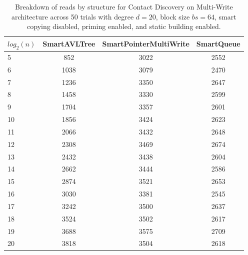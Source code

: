 \begin{table}[]
\centering
\begin{tabular}{|l|c|c|c|}
$log_2(n)$ & SmartAVLTree & SmartPointerMultiWrite & SmartQueue \\ \hline
5 & 852 & 3022 & 2552 \\ \hline
6 & 1038 & 3079 & 2470 \\ \hline
7 & 1236 & 3350 & 2647 \\ \hline
8 & 1458 & 3330 & 2599 \\ \hline
9 & 1704 & 3357 & 2601 \\ \hline
10 & 1856 & 3424 & 2623 \\ \hline
11 & 2066 & 3432 & 2648 \\ \hline
12 & 2308 & 3469 & 2674 \\ \hline
13 & 2432 & 3438 & 2604 \\ \hline
14 & 2662 & 3444 & 2586 \\ \hline
15 & 2874 & 3521 & 2653 \\ \hline
16 & 3030 & 3381 & 2545 \\ \hline
17 & 3242 & 3500 & 2637 \\ \hline
18 & 3524 & 3502 & 2617 \\ \hline
19 & 3688 & 3575 & 2709 \\ \hline
20 & 3818 & 3504 & 2618 \\ \hline
\end{tabular}
\caption{Breakdown of reads by structure for Contact Discovery on Multi-Write architecture across 50 trials with degree $d=20$, block size $bs=64$, smart copying disabled, priming enabled, and static building enabled.}
    \label{tab:reads_by_structure_cd_d20_bs64_trials50_copiesfalse_primetrue_staticinsertiontrue_ptmultiwrite_movetrue}
\end{table}

